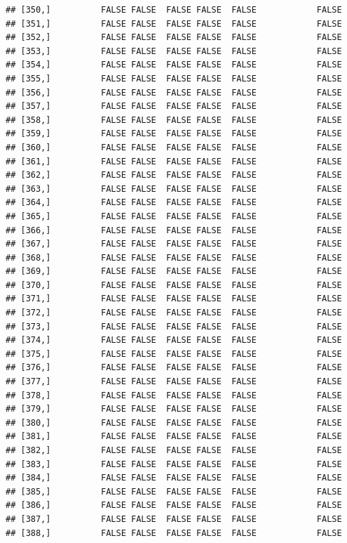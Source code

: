 \documentclass[
  english,
  man,floatsintext]{apa6}
\begin{document}
\begin{verbatim}
## [350,]          FALSE FALSE  FALSE FALSE  FALSE            FALSE
## [351,]          FALSE FALSE  FALSE FALSE  FALSE            FALSE
## [352,]          FALSE FALSE  FALSE FALSE  FALSE            FALSE
## [353,]          FALSE FALSE  FALSE FALSE  FALSE            FALSE
## [354,]          FALSE FALSE  FALSE FALSE  FALSE            FALSE
## [355,]          FALSE FALSE  FALSE FALSE  FALSE            FALSE
## [356,]          FALSE FALSE  FALSE FALSE  FALSE            FALSE
## [357,]          FALSE FALSE  FALSE FALSE  FALSE            FALSE
## [358,]          FALSE FALSE  FALSE FALSE  FALSE            FALSE
## [359,]          FALSE FALSE  FALSE FALSE  FALSE            FALSE
## [360,]          FALSE FALSE  FALSE FALSE  FALSE            FALSE
## [361,]          FALSE FALSE  FALSE FALSE  FALSE            FALSE
## [362,]          FALSE FALSE  FALSE FALSE  FALSE            FALSE
## [363,]          FALSE FALSE  FALSE FALSE  FALSE            FALSE
## [364,]          FALSE FALSE  FALSE FALSE  FALSE            FALSE
## [365,]          FALSE FALSE  FALSE FALSE  FALSE            FALSE
## [366,]          FALSE FALSE  FALSE FALSE  FALSE            FALSE
## [367,]          FALSE FALSE  FALSE FALSE  FALSE            FALSE
## [368,]          FALSE FALSE  FALSE FALSE  FALSE            FALSE
## [369,]          FALSE FALSE  FALSE FALSE  FALSE            FALSE
## [370,]          FALSE FALSE  FALSE FALSE  FALSE            FALSE
## [371,]          FALSE FALSE  FALSE FALSE  FALSE            FALSE
## [372,]          FALSE FALSE  FALSE FALSE  FALSE            FALSE
## [373,]          FALSE FALSE  FALSE FALSE  FALSE            FALSE
## [374,]          FALSE FALSE  FALSE FALSE  FALSE            FALSE
## [375,]          FALSE FALSE  FALSE FALSE  FALSE            FALSE
## [376,]          FALSE FALSE  FALSE FALSE  FALSE            FALSE
## [377,]          FALSE FALSE  FALSE FALSE  FALSE            FALSE
## [378,]          FALSE FALSE  FALSE FALSE  FALSE            FALSE
## [379,]          FALSE FALSE  FALSE FALSE  FALSE            FALSE
## [380,]          FALSE FALSE  FALSE FALSE  FALSE            FALSE
## [381,]          FALSE FALSE  FALSE FALSE  FALSE            FALSE
## [382,]          FALSE FALSE  FALSE FALSE  FALSE            FALSE
## [383,]          FALSE FALSE  FALSE FALSE  FALSE            FALSE
## [384,]          FALSE FALSE  FALSE FALSE  FALSE            FALSE
## [385,]          FALSE FALSE  FALSE FALSE  FALSE            FALSE
## [386,]          FALSE FALSE  FALSE FALSE  FALSE            FALSE
## [387,]          FALSE FALSE  FALSE FALSE  FALSE            FALSE
## [388,]          FALSE FALSE  FALSE FALSE  FALSE            FALSE

\end{verbatim}
\end{document}

